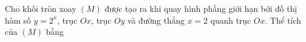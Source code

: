 \begin{ex}
Cho khối tròn xoay $(M)$ được tạo ra khi quay hình phẳng giới hạn bởi đồ thị hàm số $y=2^x$, trục $Ox$, trục $Oy$ và đường thẳng $x=2$ quanh trục $Ox$. Thể tích của $(M)$ bằng
\end{ex}
